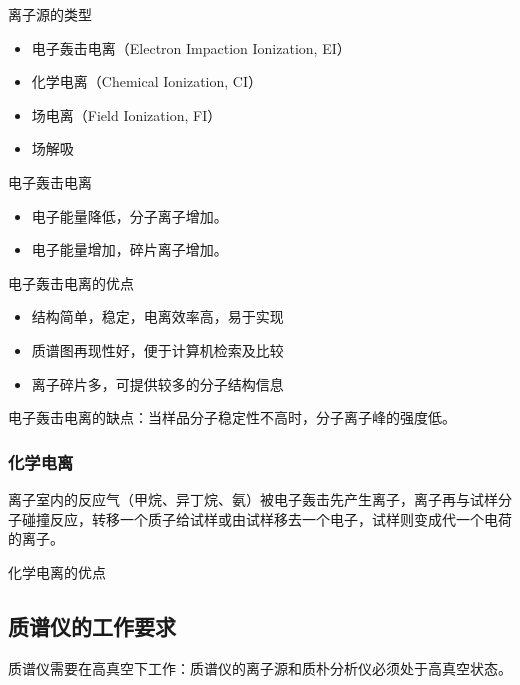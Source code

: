 离子源的类型
\begin{itemize}
    \item 电子轰击电离（Electron Impaction Ionization, EI）
    \item 化学电离（Chemical Ionization, CI）
    \item 场电离（Field Ionization, FI）
    \item 场解吸
\end{itemize}
电子轰击电离
\begin{itemize}
    \item 电子能量降低，分子离子增加。
    \item 电子能量增加，碎片离子增加。
\end{itemize}
电子轰击电离的优点
\begin{itemize}
    \item 结构简单，稳定，电离效率高，易于实现
    \item 质谱图再现性好，便于计算机检索及比较
    \item 离子碎片多，可提供较多的分子结构信息
\end{itemize}
电子轰击电离的缺点：当样品分子稳定性不高时，分子离子峰的强度低。

\subsubsection{化学电离}
离子室内的反应气（甲烷、异丁烷、氨）被电子轰击先产生离子，离子再与试样分子碰撞反应，转移一个质子给试样或由试样移去一个电子，试样则变成代一个电荷的离子。

化学电离的优点

\subsection{质谱仪的工作要求}
质谱仪需要在高真空下工作：质谱仪的离子源和质朴分析仪必须处于高真空状态。